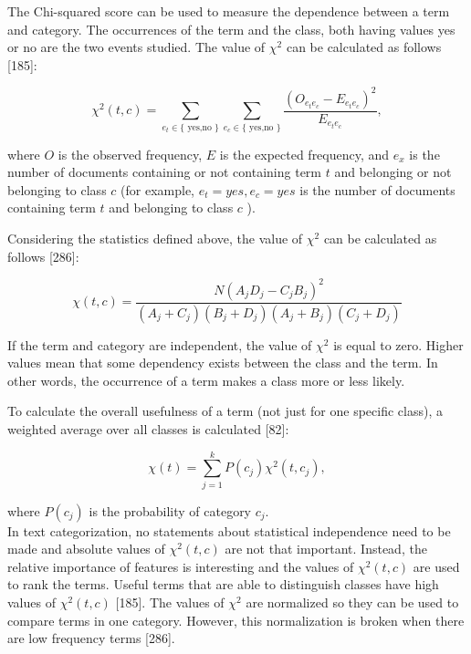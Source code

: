 \documentclass[10pt]{book}
\begin{document}
The Chi-squared score can be used to measure the dependence between a term and category. The occurrences of the term and the class, both having values yes or no are the two events studied. The value of $\chi^{2}$ can be calculated as follows [185]:


\begin{equation*}
\chi^{2}(t, c)=\sum_{e_{t} \in\{\text { yes,no }\}} \sum_{e_{c} \in\{\text { yes,no }\}} \frac{\left(O_{e_{t} e_{c}}-E_{e_{t} e_{c}}\right)^{2}}{E_{e_{t} e_{c}}}, \tag{14.2}
\end{equation*}


where $O$ is the observed frequency, $E$ is the expected frequency, and $e_{x}$ is the number of documents containing or not containing term $t$ and belonging or not belonging to class $c$ (for example, $e_{t}=y e s, e_{c}=y e s$ is the number of documents containing term $t$ and belonging to class $c$ ).

Considering the statistics defined above, the value of $\chi^{2}$ can be calculated as follows [286]:


\begin{equation*}
\chi(t, c)=\frac{N\left(A_{j} D_{j}-C_{j} B_{j}\right)^{2}}{\left(A_{j}+C_{j}\right)\left(B_{j}+D_{j}\right)\left(A_{j}+B_{j}\right)\left(C_{j}+D_{j}\right)} \tag{14.3}
\end{equation*}


If the term and category are independent, the value of $\chi^{2}$ is equal to zero. Higher values mean that some dependency exists between the class and the term. In other words, the occurrence of a term makes a class more or less likely.

To calculate the overall usefulness of a term (not just for one specific class), a weighted average over all classes is calculated [82]:


\begin{equation*}
\chi(t)=\sum_{j=1}^{k} P\left(c_{j}\right) \chi^{2}\left(t, c_{j}\right), \tag{14.4}
\end{equation*}


where $P\left(c_{j}\right)$ is the probability of category $c_{j}$.\\
In text categorization, no statements about statistical independence need to be made and absolute values of $\chi^{2}(t, c)$ are not that important. Instead, the relative importance of features is interesting and the values of $\chi^{2}(t, c)$ are used to rank the terms. Useful terms that are able to distinguish classes have high values of $\chi^{2}(t, c)$ [185]. The values of $\chi^{2}$ are normalized so they can be used to compare terms in one category. However, this normalization is broken when there are low frequency terms [286].
\end{document}
